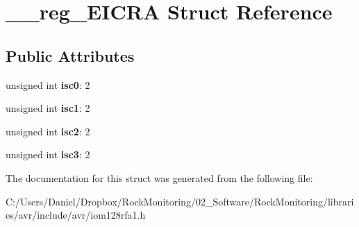 \hypertarget{struct____reg___e_i_c_r_a}{}\section{\+\_\+\+\_\+reg\+\_\+\+E\+I\+C\+RA Struct Reference}
\label{struct____reg___e_i_c_r_a}
\subsection*{Public Attributes}
\begin{DoxyCompactItemize}
\item 
unsigned int {\bfseries isc0}\+: 2\hypertarget{struct____reg___e_i_c_r_a_ac6459cca44cb9034c5ac694f14cf06fe}{}\label{struct____reg___e_i_c_r_a_ac6459cca44cb9034c5ac694f14cf06fe}

\item 
unsigned int {\bfseries isc1}\+: 2\hypertarget{struct____reg___e_i_c_r_a_a8451f24611d77895e290412473bcd0c9}{}\label{struct____reg___e_i_c_r_a_a8451f24611d77895e290412473bcd0c9}

\item 
unsigned int {\bfseries isc2}\+: 2\hypertarget{struct____reg___e_i_c_r_a_aac32b6c9ffaa0a450b06f04d7fcf7a64}{}\label{struct____reg___e_i_c_r_a_aac32b6c9ffaa0a450b06f04d7fcf7a64}

\item 
unsigned int {\bfseries isc3}\+: 2\hypertarget{struct____reg___e_i_c_r_a_aafaeb1d8198ac00adcda8090235cbb46}{}\label{struct____reg___e_i_c_r_a_aafaeb1d8198ac00adcda8090235cbb46}

\end{DoxyCompactItemize}


The documentation for this struct was generated from the following file\+:\begin{DoxyCompactItemize}
\item 
C\+:/\+Users/\+Daniel/\+Dropbox/\+Rock\+Monitoring/02\+\_\+\+Software/\+Rock\+Monitoring/libraries/avr/include/avr/iom128rfa1.\+h\end{DoxyCompactItemize}
